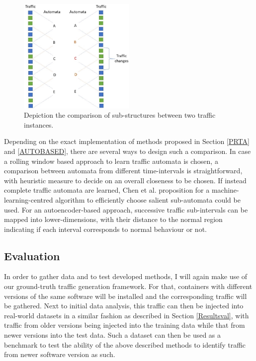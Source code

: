 \documentclass[a4paper,12pt,twoside]{report}
\begin{document}
\begin{figure}
\centering
\includegraphics[width=0.5\textwidth]{images/Robust.jpg}
\caption{Depiction the comparison of sub-structures between two traffic instances.}\label{Robust}
\end{figure}

Depending on the exact implementation of methods proposed in Section \ref{PRTA} and \ref{AUTOBASED}, there are several ways to design such a comparison. In case a rolling window based approach to learn traffic automata is chosen, a comparison between automata from different time-intervals is straightforward, with  heuristic measure to decide on an overall closeness to be chosen. If instead complete traffic automata are learned, Chen et al. proposition for a machine-learning-centred algorithm to efficiently choose salient sub-automata could be used. For an autoencoder-based approach, successive traffic sub-intervals can be mapped into lower-dimensions, with their distance to the normal region indicating if each interval corresponds to normal behaviour or not. 

\subsection{Evaluation}

In order to gather data and to test developed methods, I will again make use of our ground-truth traffic generation framework. For that, containers with different versions of the same software will be installed and the corresponding traffic will be gathered. Next to initial data analysis, this traffic can then be injected into real-world datasets in a similar fashion as described in Section \ref{Resultsval}, with traffic from older versions being injected into the training data while that from newer versions into the test data. Such a dataset can then be used as a benchmark to test the ability of the above described methods to identify traffic from newer software version as such. 
\end{document}
